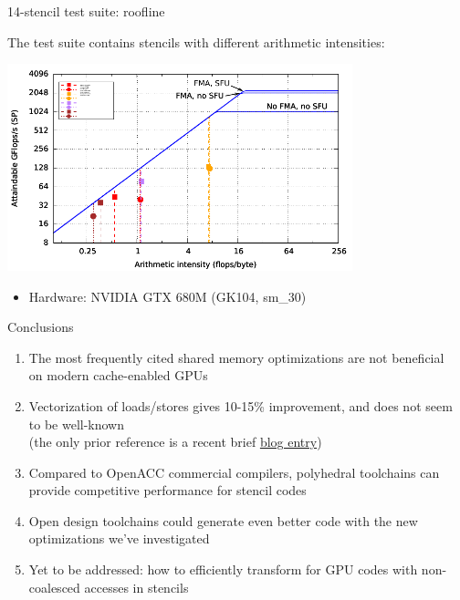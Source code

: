 \documentclass[aspectratio=169]{beamer}
\begin{document}
\begin{frame}[fragile]{14-stencil test suite: roofline}

The test suite contains stencils with different arithmetic intensities:
\vskip3pt
\begin{minipage}{10cm}
\includegraphics[width=10cm]{roofline_gtx680m}
\end{minipage}%
\begin{minipage}{5cm}
{\footnotesize
\begin{itemize}
\item Hardware: NVIDIA GTX 680M (GK104, sm\_30)
\end{itemize}}
\end{minipage}

\end{frame}



\begin{frame}[fragile]{Conclusions}

\begin{enumerate}
\item The most frequently cited shared memory optimizations are not beneficial\\ on modern cache-enabled GPUs
\item Vectorization of loads/stores gives 10-15\% improvement, and does not seem to be well-known\\ (the only prior reference is a recent brief \href{http://devblogs.nvidia.com/parallelforall/cuda-pro-tip-increase-performance-with-vectorized-memory-access/}{blog entry})
\item Compared to OpenACC commercial compilers, polyhedral toolchains can provide competitive performance for stencil codes
\item Open design toolchains could generate even better code with the new optimizations we've investigated
\item Yet to be addressed: how to efficiently transform for GPU codes with non-coalesced accesses in stencils
\end{enumerate}

\end{frame}
\end{document}
